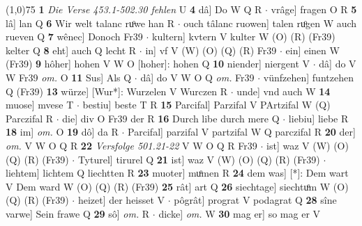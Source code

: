 \documentclass[8pt,a4paper,notitlepage]{article}
\begin{document}
\begin{table}[ht]
\begin{minipage}[t]{0.5\linewidth}
\line(1,0){75} \newline
\textbf{1} \textit{Die Verse 453.1-502.30 fehlen} U  \textbf{4} dâ] Do W Q R  $\cdot$ vrâge] fragen O R \textbf{5} lâ] lan Q \textbf{6} Wir welt talanc ruͦwe han R  $\cdot$ ouch tâlanc ruowen] talen ruͦgen W auch rueven Q \textbf{7} wênec] Donoch Fr39  $\cdot$ kultern] kvtern V kulter W (O) (R) (Fr39) kelter Q \textbf{8} eht] auch Q lecht R  $\cdot$ in] vf V (W) (O) (Q) (R) Fr39  $\cdot$ ein] einen W (Fr39) \textbf{9} hôher] hohen V W O [hoher]: hohen Q \textbf{10} niender] niergent V  $\cdot$ dâ] do V W Fr39 \textit{om.} O \textbf{11} Sus] Als Q  $\cdot$ dâ] do V W O Q \textit{om.} Fr39  $\cdot$ vünfzehen] funtzehen Q (Fr39) \textbf{13} würze] [Wur*]: Wurzelen V Wurczen R  $\cdot$ unde] vnd auch W \textbf{14} muose] mvese T  $\cdot$ bestiu] beste T R \textbf{15} Parcifal] Parzifal V PArtzifal W (Q) Parczifal R  $\cdot$ die] div O Fr39 der R \textbf{16} Durch libe durch mere Q  $\cdot$ liebiu] liebe R \textbf{18} im] \textit{om.} O \textbf{19} dô] da R  $\cdot$ Parcifal] parzifal V partzifal W Q parczifal R \textbf{20} der] \textit{om.} V W O Q R \textbf{22} \textit{Versfolge 501.21-22} V W O Q R Fr39   $\cdot$ ist] waz V (W) (O) (Q) (R) (Fr39)  $\cdot$ Tyturel] tirurel Q \textbf{21} ist] waz V (W) (O) (Q) (R) (Fr39)  $\cdot$ liehtem] lichtem Q liechtten R \textbf{23} muoter] muͦmen R \textbf{24} dem was] [*]: Dem wart V Dem ward W (O) (Q) (R) (Fr39) \textbf{25} rât] art Q \textbf{26} siechtage] siechtuͦm W (O) (Q) (R) (Fr39)  $\cdot$ heizet] der heisset V  $\cdot$ pôgrât] prograt V podagrat Q \textbf{28} sîne varwe] Sein frawe Q \textbf{29} sô] \textit{om.} R  $\cdot$ dicke] \textit{om.} W \textbf{30} mag er] so mag er V \newline
\end{minipage}
\end{table}
\end{document}
